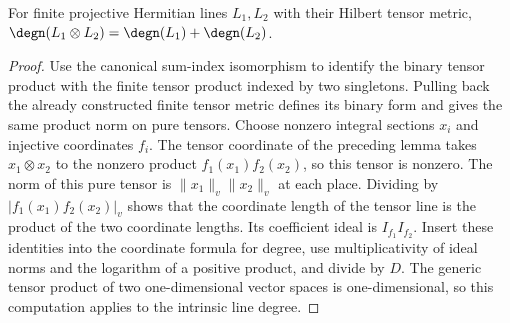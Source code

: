 \begin{lemma}
\label{lem:line-tensor-degree}
\leanok
For finite projective Hermitian lines $L_1,L_2$ with their Hilbert tensor
metric, $\degn(L_1\otimes L_2)=\degn(L_1)+\degn(L_2)$.
\end{lemma}
\begin{proof}
Use the canonical sum-index isomorphism to identify the binary tensor
product with the finite tensor product indexed by two singletons. Pulling
back the already constructed finite tensor metric defines its binary form
and gives the same product norm on pure tensors. Choose nonzero integral
sections $x_i$ and injective coordinates $f_i$.
The tensor coordinate of the preceding lemma takes $x_1\otimes x_2$
to the nonzero product $f_1(x_1)f_2(x_2)$, so this tensor is nonzero.
The norm of this pure tensor is $\|x_1\|_v\|x_2\|_v$ at each place.
Dividing by $|f_1(x_1)f_2(x_2)|_v$ shows that the coordinate length
of the tensor line is the product of the two coordinate lengths.
Its coefficient ideal is $I_{f_1}I_{f_2}$. Insert these identities into
the coordinate formula for degree, use multiplicativity of ideal norms
and the logarithm of a positive product, and divide by $D$.
The generic tensor product of two one-dimensional vector spaces is
one-dimensional, so this computation applies to the intrinsic line degree.
\end{proof}


